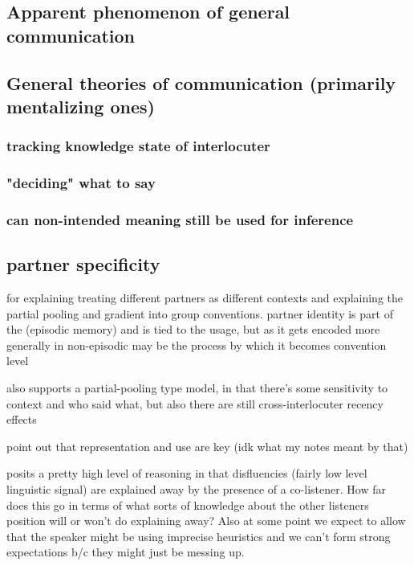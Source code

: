\documentclass[]{article}
\begin{document}
\subsection{Apparent phenomenon of general communication}

\subsection{General theories of communication (primarily mentalizing ones)}

\subsubsection{tracking knowledge state of interlocuter}
\subsubsection{"deciding" what to say}

\subsubsection{can non-intended meaning still be used for inference}

\subsection{partner specificity}

\cite{hawkins2021} for explaining treating different partners as different contexts and explaining the partial pooling and gradient into group conventions. partner identity is part of the (episodic memory) and is tied to the usage, but as it gets encoded more generally in non-episodic may be the process by which it becomes convention level 

\cite{yoon2014} also supports a partial-pooling type model, in that there's some sensitivity to context and who said what, but also there are still cross-interlocuter recency effects

\cite{yoon2014} point out that representation and use are key (idk what my notes meant by that) 

\cite{yoon2014} posits a pretty high level of reasoning in that disfluencies (fairly low level linguistic signal) are explained away by the presence of a co-listener. How far does this go in terms of what sorts of knowledge about the other listeners position will or won't do explaining away? Also at some point we expect to allow that the speaker might be using imprecise heuristics and we can't form strong expectations b/c they might just be messing up. 
\end{document}
